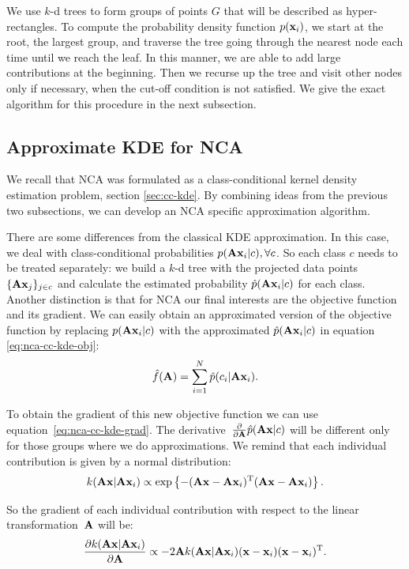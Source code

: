 We use $k$-d trees to form groups of points $G$ that will be described as hyper-rectangles. To compute the probability density function $p(\mathbf{x}_i)$, we start at the root, the largest group, and traverse the tree going through the nearest node each time until we reach the leaf. In this manner, we are able to add large contributions at the beginning. Then we recurse up the tree and visit other nodes only if necessary, when the cut-off condition is not satisfied. We give the exact algorithm for this procedure in the next subsection.

\subsection{Approximate KDE for NCA}
\label{subsec:approx-KDE-for-NCA}
 
We recall that NCA was formulated as a class-conditional kernel density estimation problem, section \ref{sec:cc-kde}. By combining ideas from the previous two subsections, we can develop an NCA specific approximation algorithm.

There are some differences from the classical KDE approximation. In this case, we deal with class-conditional probabilities $p(\mathbf{A}\mathbf{x}_i|c),\forall c$. So each class $c$ needs to be treated separately: we build a $k$-d tree with the projected data points $\{\mathbf{A}\mathbf{x}_j\}_{j\in c}$ and calculate the estimated probability $\hat{p}(\mathbf{A}\mathbf{x}_i|c)$ for each class. Another distinction is that for NCA our final interests are the objective function and its gradient. We can easily obtain an approximated version of the objective function by replacing $p(\mathbf{A}\mathbf{x}_i|c)$ with the approximated $\hat{p}(\mathbf{A}\mathbf{x}_i|c)$ in equation \eqref{eq:nca-cc-kde-obj}:
\begin{align}
	    \hat{f}(\mathbf{A}) = \sum_{i=1}^{N} \hat{p}(c_i|\mathbf{A}\mathbf{x}_i).
	    \label{eq:nca-cc-kde-obj-approx}
\end{align}

To obtain the gradient of this new objective function we can use equation~\eqref{eq:nca-cc-kde-grad}. The derivative~$\frac{\partial}{\partial \mathbf{A}}\hat{p}(\mathbf{A}\mathbf{x}|c)$ will be different only for those groups where we do approximations. We remind that each individual contribution is given by a normal distribution:
\begin{align}
  k(\mathbf{A}\mathbf{x}|\mathbf{A}\mathbf{x}_i) \propto \exp\left\{ -(\mathbf{A}\mathbf{x} - \mathbf{A}\mathbf{x}_i)^\textrm{T}(\mathbf{A}\mathbf{x} - \mathbf{A}\mathbf{x}_i) \right\}.
\end{align}

So the gradient of each individual contribution with respect to the linear transformation~$\mathbf{A}$ will be:
\begin{align}
  \frac{\partial k(\mathbf{A}\mathbf{x}|\mathbf{A}\mathbf{x}_i)}{\partial \mathbf{A}} \propto -2\mathbf{A} k(\mathbf{A}\mathbf{x}|\mathbf{A}\mathbf{x}_i)(\mathbf{x}-\mathbf{x}_i)(\mathbf{x}-\mathbf{x}_i)^\textrm{T}.
\end{align}

